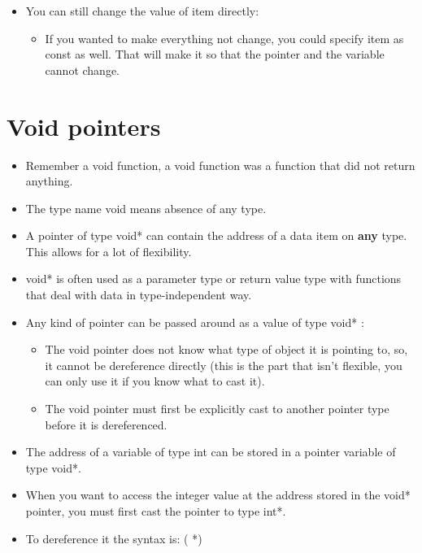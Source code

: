 \begin{itemize}
    \item You can still change the value of item directly:
        \begin{itemize}
            \item If you wanted to make everything not change, you could specify item as const as well. That will make it so that the pointer and the variable cannot change. 
        \end{itemize}
\end{itemize}

\section{Void pointers}
\begin{itemize}
    \item Remember a void function, a void function was a function that did not return anything. 
    \item The type name void means absence of any type. 
    \item A pointer of type void* can contain the address of a data item on \textbf{any} type. This allows for a lot of flexibility. 
    \item void* is often used as a parameter type or return value type with functions that deal with data in type-independent way. 
    \item Any kind of pointer can be passed around as a value of type void* : 
        \begin{itemize}
            \item The void pointer does not know what type of object it is pointing to, so, it cannot be dereference directly (this is the part that isn't flexible, you can only use it if you know what to cast it).
            \item The void pointer must first be explicitly cast to another pointer type before it is dereferenced. 
        \end{itemize}
    
    \item The address of a variable of type int can be stored in a pointer variable of type void*. 
    \item When you want to access the integer value at the address stored in the void* pointer, you must first cast the pointer to type int*.
    \item To dereference it the syntax is: ( *)
\end{itemize}

